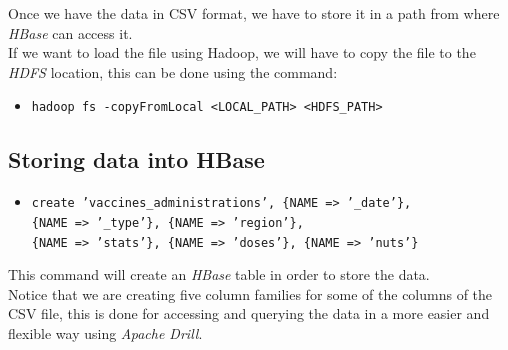 \documentclass[12pt, a4paper]{article}
\begin{document}
\noindent
Once we have the data in CSV format, we have to store it in a path from where 
\emph{HBase} can access it. \\
If we want to load the file using Hadoop, we will have to copy the file to the 
\emph{HDFS} location, this can be done using the command:
\begin{footnotesize}
  \begin{itemize}
    \item[] \texttt{hadoop fs -copyFromLocal <LOCAL\_PATH>  <HDFS\_PATH>} 
  \end{itemize}
\end{footnotesize}

\subsection{Storing data into HBase}

\begin{footnotesize}
  \begin{itemize}
    \item[] \texttt{create 'vaccines\_administrations', \{NAME => '\_date'\}, \\
      \{NAME => '\_type'\}, \{NAME => 'region'\}, \\
      \{NAME => 'stats'\}, \{NAME => 'doses'\}, \{NAME => 'nuts'\}} 
  \end{itemize}
\end{footnotesize}
This command will create an \emph{HBase} table in order to store the data. \\
Notice that we are creating five column families for some of the columns of the CSV file,
this is done for accessing and querying the data in a more easier and flexible way using
\emph{Apache Drill}. 

\noindent
\end{document}
